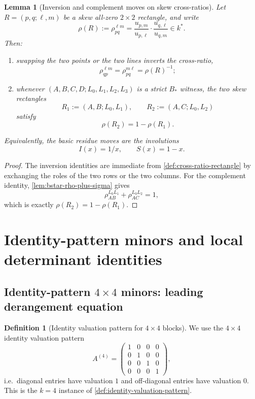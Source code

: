 \documentclass[11pt]{amsart}
\numberwithin{equation}{section}
\theoremstyle{plain}
\newtheorem{lemma}[theorem]{Lemma}
\theoremstyle{definition}
\newtheorem{definition}[theorem]{Definition}
\theoremstyle{remark}
\begin{document}
\begin{lemma}[Inversion and complement moves on skew cross-ratios]
\label{lem:cross-ratio-inversion-complement}
Let $R=(p,q;\ell,m)$ be a skew all-zero $2\times2$ rectangle, and write
\[
\rho(R):=\rho_{pq}^{\ell m}=\frac{u_{p,m}}{u_{p,\ell}}\cdot\frac{u_{q,\ell}}{u_{q,m}}\in k^*.
\]
Then:
\begin{enumerate}[leftmargin=2em]
  \item swapping the two points or the two lines inverts the cross-ratio,
  \[
  \rho_{qp}^{\ell m}=\rho_{pq}^{m\ell}=\rho(R)^{-1};
  \]
  \item whenever $(A,B,C,D;L_0,L_1,L_2,L_3)$ is a strict $B_*$ witness, the two skew rectangles
  \[
  R_1:=(A,B;L_0,L_1),\qquad R_2:=(A,C;L_0,L_2)
  \]
  satisfy
  \[
  \rho(R_2)=1-\rho(R_1).
  \]
\end{enumerate}
Equivalently, the basic residue moves are the involutions
\[
I(x)=1/x,\qquad S(x)=1-x.
\]
\end{lemma}

\begin{proof}
The inversion identities are immediate from \cref{def:cross-ratio-rectangle} by exchanging the roles of the two rows or the two columns.
For the complement identity, \cref{lem:bstar-rho-plus-sigma} gives
\[
\rho_{AB}^{L_0L_1}+\rho_{AC}^{L_0L_2}=1,
\]
which is exactly $\rho(R_2)=1-\rho(R_1)$.
\end{proof}



\section{Identity-pattern minors and local determinant identities}
\label{sec:gadgets}

\subsection{\texorpdfstring{Identity-pattern $4\times4$ minors: leading derangement equation}{Identity-pattern 4x4 minors: leading derangement equation}}

\begin{definition}[Identity valuation pattern for $4\times4$ blocks]
\label{def:identity4-pattern}
We use the $4\times4$ identity valuation pattern
\[
A^{(4)}=\begin{pmatrix}
1&0&0&0\\
0&1&0&0\\
0&0&1&0\\
0&0&0&1
\end{pmatrix},
\]
i.e.\ diagonal entries have valuation $1$ and off-diagonal entries have valuation $0$.
This is the $k=4$ instance of \cref{def:identity-valuation-pattern}.
\end{definition}
\end{document}
